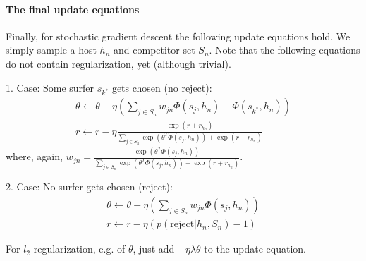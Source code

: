 \paragraph{The final update equations}

Finally, for stochastic gradient descent the following update equations hold. We simply sample a host $h_n$ and competitor set $S_n$. Note that the following equations do not contain regularization, yet (although trivial).

1. Case: Some surfer $s_{k^*}$ gets chosen (no reject):
\begin{eqnarray}
\theta \leftarrow \theta - \eta (\sum_{j \in S_n} w_{jn} \Phi(s_j,h_n) - \Phi(s_{k^*},h_n))\\
r \leftarrow r - \eta \frac{\exp(r + r_{h_n})}{\sum_{j \in S_n} \exp(\theta^T \Phi(s_j,h_n)) + \exp(r + r_{h_n})}
\end{eqnarray}
where, again, $w_{jn}=\frac{\exp(\theta^T \Phi(s_j,h_n))}{\sum_{j \in S_n} \exp(\theta^T \Phi(s_j,h_n)) + \exp(r + r_{h_n})}$.

2. Case: No surfer gets chosen (reject):
\begin{eqnarray}
\theta \leftarrow \theta - \eta (\sum_{j \in S_n} w_{jn} \Phi(s_j,h_n))\\
r \leftarrow r - \eta (p(\text{reject} | h_n, S_n)-1)
\end{eqnarray}

For $l_2$-regularization, e.g. of $\theta$, just add $- \eta \lambda \theta$ to the update equation.